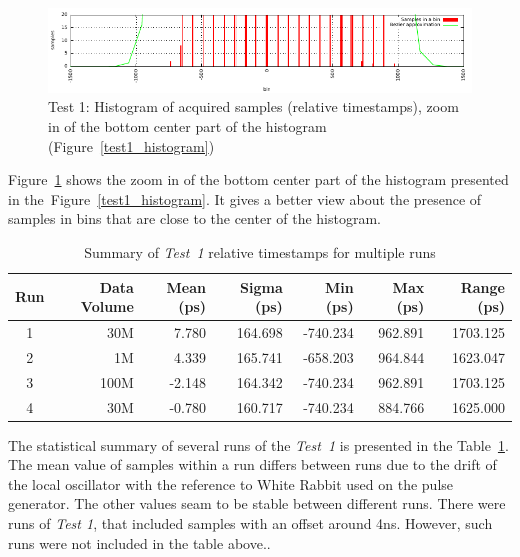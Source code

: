 \documentclass[a4paper, 12pt]{article}
\begin{document}
\begin{figure}[ht!]
  \centering
  \includegraphics[width=1\textwidth]{img/test1_histogram_zoomx.pdf}
  \caption{Test 1: Histogram of acquired samples (relative timestamps), zoom in
	   of the bottom center part of the histogram
	   (Figure~\ref{test1_histogram})}
  \label{test1_histogram_zoomx}
\end{figure}

Figure~\ref{test1_histogram_zoomx} shows the zoom in of the bottom center part
of the histogram presented in the~Figure~\ref{test1_histogram}.
It gives a better view about the presence of samples in bins that are close to
the center of the histogram.

\FloatBarrier

\begin{table}[!htb]
  \centering
  \footnotesize
  \begin{tabular}{|c|r|r|r|r|r|r|}
    \hline {\bf Run} & {\bf Data Volume} & {\bf Mean (ps)} & {\bf Sigma (ps)} & {\bf Min (ps)} & {\bf Max (ps)} & {\bf Range (ps)}  \\
    \hline
    1                &  30M              &  7.780          & 164.698          & -740.234       & 962.891        &  1703.125           \\
    2                &   1M              &  4.339          & 165.741          & -658.203       & 964.844        &  1623.047           \\
    3                & 100M              & -2.148          & 164.342          & -740.234       & 962.891        &  1703.125           \\
    4                &  30M              & -0.780          & 160.717          & -740.234       & 884.766        &  1625.000           \\
    \hline
  \end{tabular}
  \caption{Summary of \textit{Test~1} relative timestamps for multiple runs}
  \label{table_test1_summary}
\end{table}

The statistical summary of several runs of the \textit{Test~1} is presented in
the Table~\ref{table_test1_summary}.
The mean value of samples within a run differs between runs due to the drift
of the local oscillator with the reference to White Rabbit used on
the pulse generator. The other values seam to be stable between different
runs.
There were runs of \textit{Test 1}, that included samples with an offset
around 4ns. However, such runs were not included in the table above..
\end{document}
